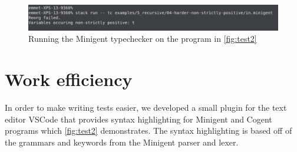 \begin{figure}
    \centering
    \includegraphics[width=\linewidth]{content/test2result.png}
    \caption{Running the Minigent typechecker on the program in \autoref{fig:test2}}
    \label{fig:test2result}
\end{figure}

\section{Work efficiency}

In order to make writing tests easier, we developed a small plugin for the text editor VSCode
that provides syntax highlighting for Minigent and Cogent programs which \autoref{fig:test2} demonstrates.
The syntax highlighting is based off of the grammars and keywords from the Minigent parser and lexer.